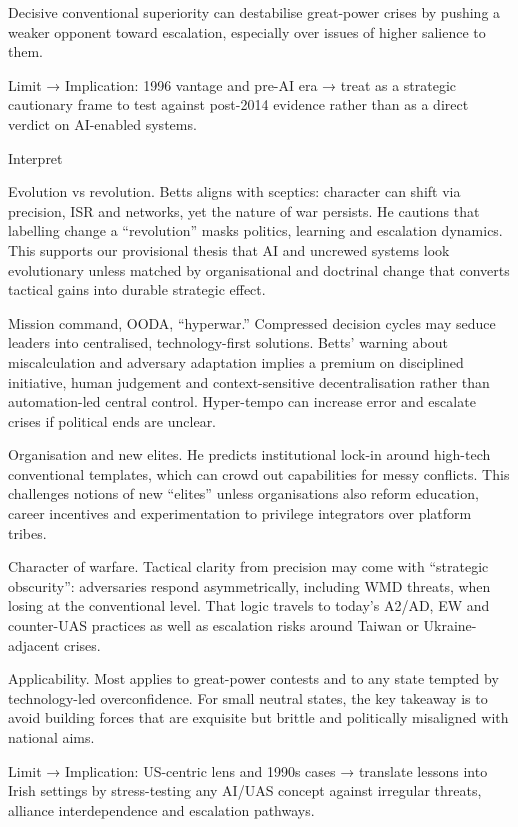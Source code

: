 Decisive conventional superiority can destabilise great-power crises by pushing a weaker opponent toward escalation, especially over issues of higher salience to them.

Limit → Implication: 1996 vantage and pre-AI era → treat as a strategic cautionary frame to test against post-2014 evidence rather than as a direct verdict on AI-enabled systems.

Interpret

Evolution vs revolution. Betts aligns with sceptics: character can shift via precision, ISR and networks, yet the nature of war persists. He cautions that labelling change a “revolution” masks politics, learning and escalation dynamics. This supports our provisional thesis that AI and uncrewed systems look evolutionary unless matched by organisational and doctrinal change that converts tactical gains into durable strategic effect.

Mission command, OODA, “hyperwar.” Compressed decision cycles may seduce leaders into centralised, technology-first solutions. Betts’ warning about miscalculation and adversary adaptation implies a premium on disciplined initiative, human judgement and context-sensitive decentralisation rather than automation-led central control. Hyper-tempo can increase error and escalate crises if political ends are unclear.

Organisation and new elites. He predicts institutional lock-in around high-tech conventional templates, which can crowd out capabilities for messy conflicts. This challenges notions of new “elites” unless organisations also reform education, career incentives and experimentation to privilege integrators over platform tribes.

Character of warfare. Tactical clarity from precision may come with “strategic obscurity”: adversaries respond asymmetrically, including WMD threats, when losing at the conventional level. That logic travels to today’s A2/AD, EW and counter-UAS practices as well as escalation risks around Taiwan or Ukraine-adjacent crises.

Applicability. Most applies to great-power contests and to any state tempted by technology-led overconfidence. For small neutral states, the key takeaway is to avoid building forces that are exquisite but brittle and politically misaligned with national aims.

Limit → Implication: US-centric lens and 1990s cases → translate lessons into Irish settings by stress-testing any AI/UAS concept against irregular threats, alliance interdependence and escalation pathways.

